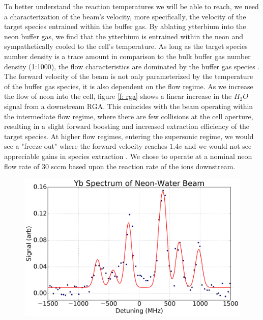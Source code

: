 To better understand the reaction temperatures we will be able to reach, we need a characterization of the beam's velocity, more specifically, the velocity of the target species entrained within the buffer gas. By ablating ytterbium into the neon buffer gas, we find that the ytterbium is entrained within the neon and sympathetically cooled to the cell's temperature. As long as the target species number density is a trace amount in comparison to the bulk buffer gas number density (1:1000), the flow characteristics are dominated by the buffer gas species \cite{Hutzler2012}. The forward velocity of the beam is not only parameterized by the temperature of the buffer gas species, it is also dependent on the flow regime. As we increase the flow of neon into the cell, figure \ref{f: rga} shows a linear increase in the $H_2O$ signal from a downstream RGA. This coincides with the beam operating within the intermediate flow regime, where there are few collisions at the cell aperture, resulting in a slight forward boosting and increased extraction efficiency of the target species. At higher flow regimes, entering the supersonic regime, we would see a "freeze out" where the forward velocity reaches $1.4\bar{v}$ and we would not see appreciable gains in species extraction \cite{Hutzler2012}. We chose to operate at a nominal neon flow rate of 30 sccm based upon the reaction rate of the ions downstream.

\begin{figure}[H]
	\centering
	\includegraphics[width=1\textwidth]{images/CBGB_yb_spectrum_long.png}
	\caption{\label{f: yb_spectrum}}
\end{figure}
